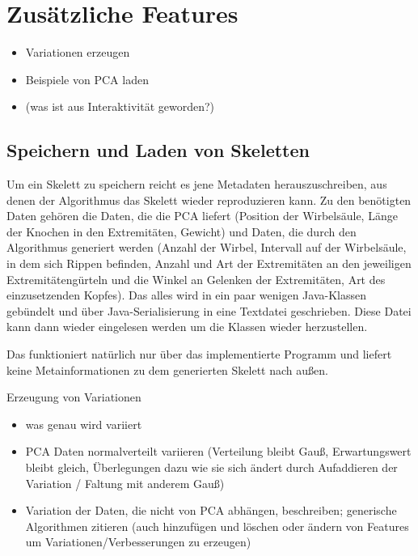 \chapter{Zusätzliche Features}
\label{chapter:additional_features}

\begin{itemize}
 \item Variationen erzeugen
 \item Beispiele von PCA laden
 \item (was ist aus Interaktivität geworden?)
\end{itemize}


\section{Speichern und Laden von Skeletten}

Um ein Skelett zu speichern reicht es jene Metadaten herauszuschreiben, aus denen der Algorithmus das Skelett wieder reproduzieren kann. Zu den benötigten Daten gehören die Daten, die die PCA liefert (Position der Wirbelsäule, Länge der Knochen in den Extremitäten, Gewicht) und Daten, die durch den Algorithmus generiert werden (Anzahl der Wirbel, Intervall auf der Wirbelsäule, in dem sich Rippen befinden, Anzahl und Art der Extremitäten an den jeweiligen Extremitätengürteln und die Winkel an Gelenken der Extremitäten, Art des einzusetzenden Kopfes).
Das alles wird in ein paar wenigen Java-Klassen gebündelt und über Java-Serialisierung in eine Textdatei geschrieben. Diese Datei kann dann wieder eingelesen werden um die Klassen wieder herzustellen.

Das funktioniert natürlich nur über das implementierte Programm und liefert keine Metainformationen zu dem generierten Skelett nach außen.


Erzeugung von Variationen 
\begin{itemize}
 \item was genau wird variiert
 \item PCA Daten normalverteilt variieren (Verteilung bleibt Gauß, Erwartungswert bleibt gleich, Überlegungen dazu wie sie sich ändert durch Aufaddieren der Variation / Faltung mit anderem Gauß)
 \item Variation der Daten, die nicht von PCA abhängen, beschreiben; generische Algorithmen zitieren (auch hinzufügen und löschen oder ändern von Features um Variationen/Verbesserungen zu erzeugen)
\end{itemize}



